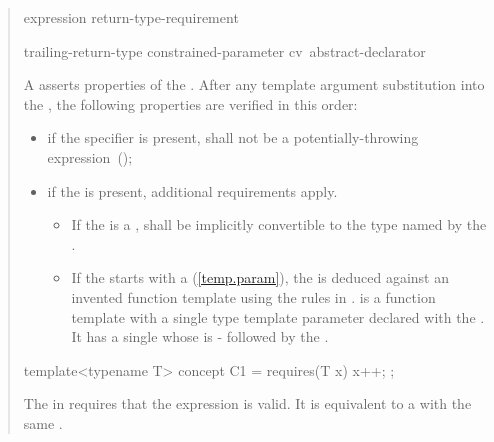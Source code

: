 \begin{quote}
\begin{addedblock}
\begin{bnf}
\br
  \terminal{\{} expression \terminal{\}} \opt 
    return-type-requirement\opt~\terminal{;}

\br
    trailing-return-type \terminal{;}\br
    constrained-parameter cv\opt~abstract-declarator\opt
\end{bnf}

\pnum
A  asserts properties
of the  . After any template argument
substitution into the ,
the following properties are verified in this order:
%
\begin{itemize}
\item if the  specifier is present,
 shall not be a potentially-throwing expression~();

\item if the  is present, additional
requirements apply.

\begin{itemize}
\item If the  is a 
,  shall be implicitly 
convertible to the type named by the
.

\item If the  starts with a 
 (\ref{temp.param}), the 
 is deduced against an invented function template
 using the rules in .  is a
 function template with a single type template parameter
 declared with the . 
It has a single  whose  is
- followed by the . 
\end{itemize}
\end{itemize}

%
\enterexample
\begin{codeblock}
template<typename T> concept C1 =
  requires(T x) {
    {x++};
  };
\end{codeblock}
The  in  
requires that the expression  is valid.
It is equivalent to a 
with the same .


\end{addedblock}
\end{quote}
